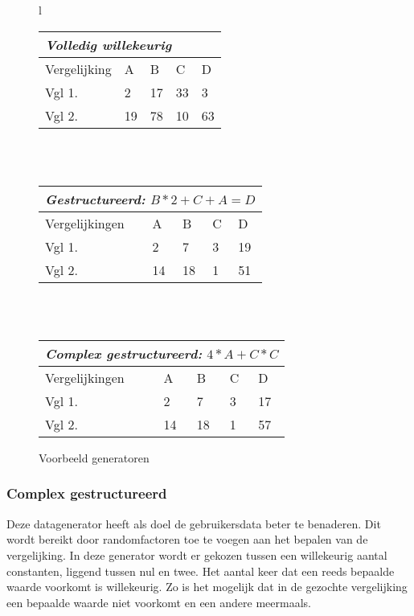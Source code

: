 \documentclass[Main.tex]{subfiles}
\begin{document}
\begin{figure}[!htb]
\centering
\begin{tabular}{ l }
\begin{tabular}{@{} *5l @{}}    \toprule
\multicolumn{5}{l}{\emph{Volledig willekeurig}}\\\midrule
 Vergelijking & A  & B  & C  & D  \\ 
 Vgl 1. & 2 & 17 & 33 & 3\\ 
 Vgl 2. & 19 & 78 & 10 & 63\\\bottomrule
 \hline
\end{tabular} \\
\\
\begin{tabular}{@{} *5l @{}}    \toprule
\multicolumn{5}{l}{\emph{Gestructureerd: } $B*2+C+A = D$} \\ \midrule
 Vergelijkingen & A  & B  & C  & D  \\ 
 Vgl 1. & 2 & 7 & 3 & 19\\ 
 Vgl 2. & 14 & 18 & 1 & 51\\\bottomrule
 \hline
\end{tabular} \\ 
\\
\begin{tabular}{@{} *5l @{}}    \toprule
\multicolumn{5}{l}{\emph{Complex gestructureerd:}  $4*A+C*C$}\\\midrule
 Vergelijkingen & A  & B  & C  & D  \\ 
 Vgl 1. & 2 & 7 & 3 & 17\\ 
 Vgl 2. & 14 & 18 & 1 & 57\\ \bottomrule
 \hline
\end{tabular}
\end{tabular}
\caption{Voorbeeld generatoren}
\label{fig:randomGeneratorExample}
\end{figure}

\subsubsection*{Complex gestructureerd}
Deze datagenerator heeft als doel de gebruikersdata beter te benaderen. Dit wordt bereikt door randomfactoren toe te voegen aan het bepalen van de vergelijking. In deze generator wordt er gekozen tussen een willekeurig aantal constanten, liggend tussen nul en twee. Het aantal keer dat een reeds bepaalde waarde voorkomt is willekeurig. Zo is het mogelijk dat in de gezochte vergelijking een bepaalde waarde niet voorkomt en een andere meermaals.
\end{document}
